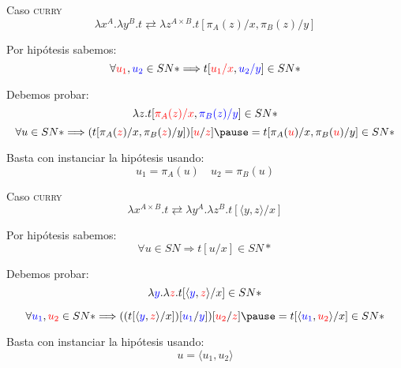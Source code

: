 \begin{frame}{Caso \textsc{curry}}
	\[ \lambda x^A. \lambda y^B. t \rightleftarrows \lambda z^{A \times B}. t[\pi_A(z)/x, \pi_B(z)/y] \]
	\pause
	
	Por hipótesis sabemos:
	\[ \forall \textcolor{red}{u_1}, \textcolor{blue}{u_2} \in SN* \Longrightarrow t[\textcolor{red}{u_1/x}, \textcolor{blue}{u_2/y}] \in SN* \]
	\pause
	
	Debemos probar:
	\[ \lambda z. t[\textcolor{red}{\pi_A(z)/x}, \textcolor{blue}{\pi_B(z)/y}] \in SN* \]
	\pause
	\[ \forall u \in SN* \Longrightarrow (t[\pi_A(\textcolor{red}{z})/x, \pi_B(\textcolor{red}{z})/y])[\textcolor{red}{u}/\textcolor{red}{z}] \pause = t[\pi_A(\textcolor{red}{u})/x, \pi_B(\textcolor{red}{u})/y] \in SN* \]
	 
	\pause
	Basta con instanciar la hipótesis usando:
	\[ u_1 = \pi_A(u) \quad u_2 = \pi_B(u) \]
\end{frame}

\begin{frame}{Caso \textsc{curry}}
	\[ \lambda x^{A \times B}. t \rightleftarrows \lambda y^A. \lambda z^B. t[\langle y, z \rangle/x] \]
	\pause
	
	Por hipótesis sabemos:
	\[ \forall u \in SN \Longrightarrow t[u/x] \in SN* \]
	\pause
	
	Debemos probar:
	\[ \lambda \textcolor{blue}{y}. \lambda \textcolor{red}{z}. t[\langle \textcolor{blue}{y}, \textcolor{red}{z} \rangle/x] \in SN* \]
	
	\pause
	\[ \forall \textcolor{blue}{u_1}, \textcolor{red}{u_2} \in SN* \Longrightarrow ((t[\langle \textcolor{blue}{y}, \textcolor{red}{z} \rangle/x])[\textcolor{blue}{u_1}/\textcolor{blue}{y}])[\textcolor{red}{u_2}/\textcolor{red}{z}] \pause = t[\langle \textcolor{blue}{u_1}, \textcolor{red}{u_2} \rangle/x] \in SN* \]

	\pause
	Basta con instanciar la hipótesis usando:
	\[ u = \langle u_1, u_2 \rangle \]
\end{frame}
